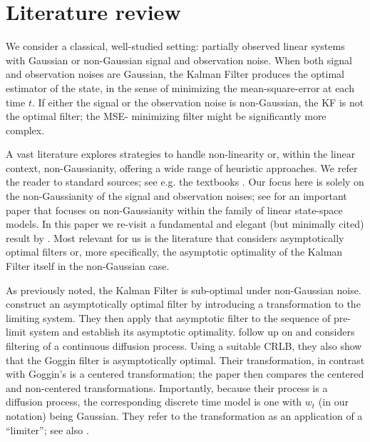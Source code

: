 \section{Literature review\label{sec:lit}
} 

We consider a classical, well-studied setting: partially observed linear systems with Gaussian or non-Gaussian signal and observation noise. When both signal and observation noises are Gaussian, the Kalman Filter \cite{kalman1960new} produces the optimal estimator of the state, in the sense of minimizing the mean-square-error at each time $t$. 
If either the signal or the observation noise is non-Gaussian, the KF is not the optimal filter; the MSE- minimizing filter might be significantly more complex. 

A vast literature explores strategies to handle non-linearity or, within the linear context, non-Gaussianity, offering a wide range of heuristic approaches.
We refer the reader to standard sources; see e.g. the textbooks \cite{sarkka2023bayesian,krishnamurthy2016partially}. 
Our focus here is solely on the non-Gaussianity of the signal and observation noises; see 
 \cite{Kitagawa1987} for an important paper that focuses on non-Gaussianity within the family of linear state-space models. In this paper we re-visit a fundamental and elegant (but minimally cited) result by  \cite{goggin1992convergence}. Most relevant for us is the literature that considers asymptotically optimal filters or, more specifically, the asymptotic optimality of the Kalman Filter itself in the non-Gaussian case. 

As previously noted, the Kalman Filter is sub-optimal under non-Gaussian noise. \cite{liptser1996robust} construct an asymptotically optimal filter by introducing a transformation to the limiting system. They then apply that asymptotic filter to the sequence of pre-limit system and establish its asymptotic optimality. \cite{Bobrovsky2001} follow up on \cite{goggin1992convergence} and considers filtering of a continuous diffusion process. Using a suitable CRLB, they also show that the Goggin filter is asymptotically optimal. Their transformation, in contrast with Goggin's is a centered transformation; the paper \cite{Liptser1998}  then compares the centered and non-centered transformations. Importantly, because their process is a diffusion process, the corresponding discrete time model is one with $w_t$ (in our notation) being Gaussian. They refer to the transformation as an application of a ``limiter''; see also \cite[Chatper 20]{Lipster1997}.

